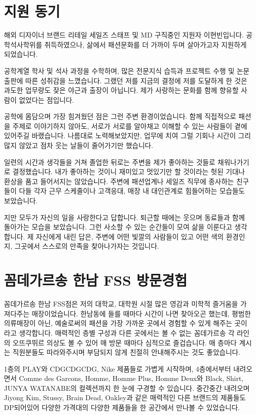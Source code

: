 \section*{지원 동기}
해외 디자이너 브랜드 리테일 세일즈 스태프 및 MD 구직중인 지원자 이현빈입니다. 공학석사학위를 취득하였으나, 삶에서 패션문화를 더 가까이 두며 살아가고자 지원하게 되었습니다.

공학계열 학사 및 석사 과정을 수학하며, 많은 전문지식 습득과 프로젝트 수행 및 논문출판에 따른 성취감을 느꼈습니다. 그랬던 저를 지금의 결정에 저를 도달하게 한 것은 과도한 업무량도 잦은 야근과 출장이 아닙니다. 제가 사랑하는 문화를 함께 향유할 사람이 없었다는 점입니다.

공학에 몸담으며 가장 힘겨웠던 점은 그런 주변 환경이었습니다. 함께 직접적으로 패션을 주제로 이야기하지 않아도, 서로가 서로를 알아채고 이해할 수 있는 사람들이 곁에 있어주길 바랬습니다. 나름대로 노력해보았지만, 업무에 치여 그럴 기회나 시간이 그리 많지 않았고 점차 웃는 날들이 줄어가기만 했습니다.

일련의 시간과 생각들을 거쳐 졸업한 뒤로는 주변을 제가 좋아하는 것들로 채워나가기로 결정했습니다. 내가 좋아하는 것이니 재미있고 멋있기만 할 것이라는 헛된 기대나 환상을 품고 들어서지는 않았습니다. 주변에 패션업계나 세일즈 직무에 종사하는 친구들이 다들 각자 근무 스케줄이나 고객응대, 매장 내 대인관계로 힘들어하는 모습들도 보았습니다.

지만 모두가 자신의 일을 사랑한다고 답합니다. 퇴근할 때에는 웃으며 동료들과 함께 돌아가는 모습을 보았습니다.
그런 사소할 수 있는 순간들이 모여 삶을 이룬다고 생각합니다. 제 자신에게 내린 답은, 주변에 어떤 빛깔의 사람들이 있고 어떤 색의 환경인지, 그곳에서 스스로의 만족을 찾아나가자는 것입니다.

\section*{꼼데가르송 한남 FSS 방문경험}
꼼데가르송 한남 FSS점은 저의 대학교, 대학원 시절 많은 영감과 미학적 즐거움을 가져다주는 매장이었습니다. 한남동에 들를 때마다 시간이 나면 찾아오곤 했는데, 평범한 의류매장이 아닌, 예술로써의 패션을 가장 가까운 곳에서 경험할 수 있게 해주는 곳이라고 생각합니다. 매력적인 층별 구성과 다른 곳에서는 볼 수 없는 꼼데가르송 각 라인의 오뜨쿠뛰르 의상도 볼 수 있어 매 방문 때마다 심적으로 즐겁습니다. 매 층마다 계시는 직원분들도 따라와주시며 부담되지 않게 친절히 안내해주시는 것도 좋았습니다.

1층의 PLAY와 CDGCDGCDG, Nike 제품들로 가볍게 시작하며, 4층에서부터 내려오면서 Comme des Garcons, Homme, Homme Plus, Homme Deux와 Black, Shirt, JUNYA WATANABE의 컬렉션까지 한 눈에 구경할 수 있습니다. 중간중간 내려오며 Jiyong Kim, Stussy, Brain Dead, Oakley과 같은 매력적인 다른 브랜드의 제품들도 DP되어있어 다양한 가격대의 다양한 제품들을 한 공간에서 만나볼 수 있었습니다.

